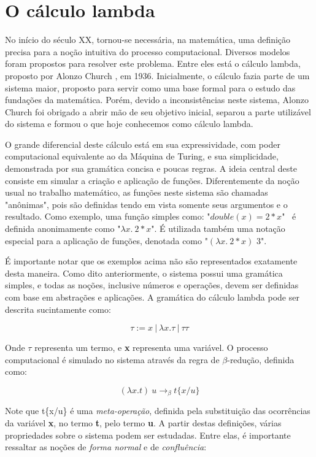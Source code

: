 \section{O cálculo lambda}
No início do século XX, tornou-se necessária, na matemática, uma definição 
precisa para a noção intuitiva do processo computacional. Diversos modelos foram
propostos para resolver este problema. Entre eles está o cálculo lambda,
proposto por Alonzo Church \cite{lambda_first}, em 1936. Inicialmente, o cálculo
fazia parte de um sistema maior, proposto para servir como uma base
formal para o estudo das fundações da matemática. Porém, devido a
inconsistências neste sistema, Alonzo Church foi obrigado a abrir mão de seu
objetivo inicial, separou a parte utilizável do sistema e formou o que hoje
conhecemos como cálculo lambda.

O grande diferencial deste cálculo está em sua expressividade, com poder
computacional equivalente ao da Máquina de Turing, e sua simplicidade,
demonstrada por sua gramática concisa e poucas regras. A ideia central deste
consiste em simular a criação e aplicação de funções. Diferentemente da noção
usual no trabalho matemático, as funções neste sistema são chamadas "anônimas",
pois são definidas tendo em vista somente seus argumentos e o resultado. Como
exemplo, uma função simples como: "$double(x) = 2*x$" \ é definida anonimamente como
"$\lambda x.\ 2*x$". É utilizada também uma notação especial para a aplicação de
funções, denotada como "$ (\lambda x.\ 2*x)$  $3$".

É importante notar que os exemplos acima não são representados exatamente desta
maneira. Como dito anteriormente, o sistema possui uma gramática simples, e
todas as noções, inclusive números e operações, devem ser definidas com base em
abstrações e aplicações. A gramática do cálculo lambda pode ser descrita
sucintamente como:

\[ \tau := x\ |\ \lambda x.\tau\ |\ \tau \tau \]

Onde $\tau$ representa um termo, e \textbf{x} representa uma variável. O processo
computacional é simulado no sistema através da regra de $\beta$-redução,
definida como:

\[ (\lambda x.t)\ u \rightarrow_{\beta} t\{x/u\} \]

Note que t\{x/u\} é uma \textit{meta-operação}, definida pela substituição das
ocorrências da variável \textbf{x}, no termo \textbf{t}, pelo termo \textbf{u}.
A partir destas definições, várias propriedades sobre o sistema podem ser
estudadas. Entre elas, é importante ressaltar as noções de \textit{forma
 normal} e de \textit{confluência}:

